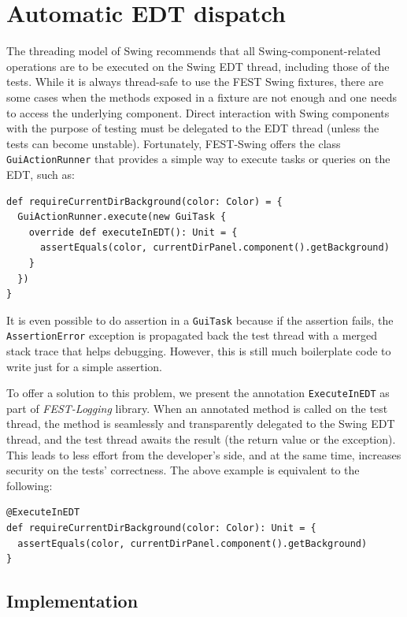 \section{Automatic EDT dispatch}\label{sec:edt-dispatch}

The threading model of Swing recommends that all Swing-component-related operations are to be executed on the Swing EDT thread, including those of the tests. While it is always thread-safe to use the FEST Swing fixtures, there are some cases when the methods exposed in a fixture are not enough and one needs to access the underlying component. Direct interaction with Swing components with the purpose of testing must be delegated to the EDT thread (unless the tests can become unstable). Fortunately, FEST-Swing offers the class \texttt{GuiActionRunner} that provides a simple way to execute tasks or queries on the EDT, such as:
\begin{lstlisting}
def requireCurrentDirBackground(color: Color) = {
  GuiActionRunner.execute(new GuiTask {
    override def executeInEDT(): Unit = {
      assertEquals(color, currentDirPanel.component().getBackground)
    }
  })
}
\end{lstlisting}
It is even possible to do assertion in a \texttt{GuiTask} because if the assertion fails, the \texttt{Assertion\-Error} exception is propagated back the test thread with a merged stack trace that helps debugging. However, this is still much boilerplate code to write just for a simple assertion.

To offer a solution to this problem, we present the annotation \texttt{ExecuteInEDT} as part of \emph{FEST-Logging} library. When an annotated method is called on the test thread, the method is seamlessly and transparently delegated to the Swing EDT thread, and the test thread awaits the result (the return value or the exception). This leads to less effort from the developer's side, and at the same time, increases security on the tests' correctness. The above example is equivalent to the following:
\begin{lstlisting}
@ExecuteInEDT
def requireCurrentDirBackground(color: Color): Unit = {
  assertEquals(color, currentDirPanel.component().getBackground)
}
\end{lstlisting}

\subsection{Implementation}\label{sec:edt-dispatch}

